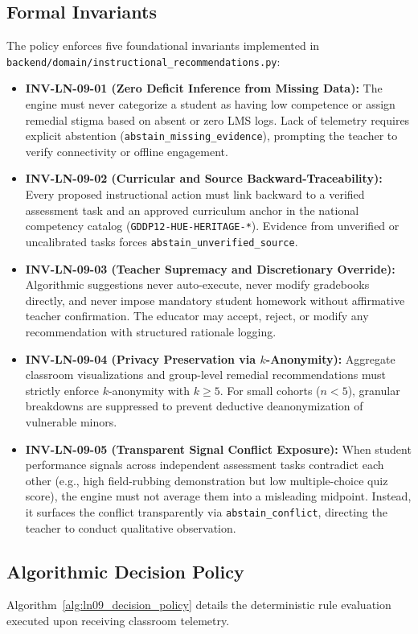 \documentclass[11pt,a4paper]{article}
\begin{document}
\subsection{Formal Invariants}
The policy enforces five foundational invariants implemented in \texttt{backend/domain/instructional\_recommendations.py}:

\begin{itemize}
    \item \textbf{\textsc{INV-LN-09-01} (Zero Deficit Inference from Missing Data):} The engine must never categorize a student as having low competence or assign remedial stigma based on absent or zero LMS logs. Lack of telemetry requires explicit abstention (\texttt{abstain\_missing\_evidence}), prompting the teacher to verify connectivity or offline engagement.
    \item \textbf{\textsc{INV-LN-09-02} (Curricular and Source Backward-Traceability):} Every proposed instructional action must link backward to a verified assessment task and an approved curriculum anchor in the national competency catalog (\texttt{GDDP12-HUE-HERITAGE-*}). Evidence from unverified or uncalibrated tasks forces \texttt{abstain\_unverified\_source}.
    \item \textbf{\textsc{INV-LN-09-03} (Teacher Supremacy and Discretionary Override):} Algorithmic suggestions never auto-execute, never modify gradebooks directly, and never impose mandatory student homework without affirmative teacher confirmation. The educator may accept, reject, or modify any recommendation with structured rationale logging.
    \item \textbf{\textsc{INV-LN-09-04} (Privacy Preservation via $k$-Anonymity):} Aggregate classroom visualizations and group-level remedial recommendations must strictly enforce $k$-anonymity \cite{sweeney2002k} with $k \ge 5$. For small cohorts ($n < 5$), granular breakdowns are suppressed to prevent deductive deanonymization of vulnerable minors.
    \item \textbf{\textsc{INV-LN-09-05} (Transparent Signal Conflict Exposure):} When student performance signals across independent assessment tasks contradict each other (e.g., high field-rubbing demonstration but low multiple-choice quiz score), the engine must not average them into a misleading midpoint. Instead, it surfaces the conflict transparently via \texttt{abstain\_conflict}, directing the teacher to conduct qualitative observation.
\end{itemize}

\subsection{Algorithmic Decision Policy}
Algorithm~\ref{alg:ln09_decision_policy} details the deterministic rule evaluation executed upon receiving classroom telemetry.
\end{document}
